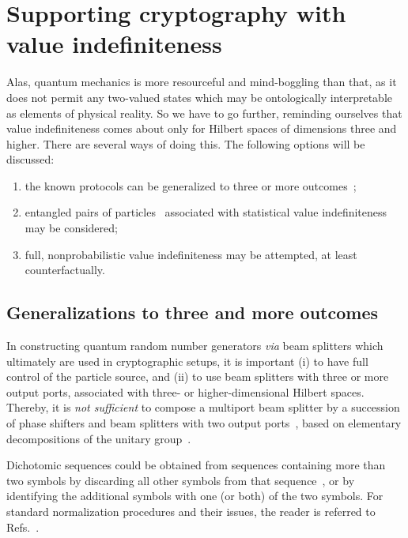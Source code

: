 \documentclass[12pt]{elsarticle}%
\begin{document}
\section{Supporting cryptography with value indefiniteness}

Alas, quantum mechanics is more resourceful and mind-boggling than that,
as it does not permit any two-valued states which may be ontologically  interpretable
as elements of physical reality.
So we have to go further, reminding ourselves that value indefiniteness
comes about only for Hilbert spaces of dimensions three and higher.
There are several ways of doing this.
The following options will be discussed:
\begin{enumerate}
\item
the known protocols can be generalized to three or more outcomes~\cite{PhysRevLett.85.3313};
\item
entangled pairs of particles~\cite{ekert91} associated with statistical value indefiniteness may be considered;
\item
full, nonprobabilistic value indefiniteness may be attempted, at least counterfactually.
\end{enumerate}


\subsection{Generalizations to three and more outcomes}

In constructing quantum random number generators {\em via} beam splitters
which ultimately are used in cryptographic setups, it is important
(i)  to have full control of the particle source, and
(ii) to use beam splitters with three or more output ports,
associated with three- or higher-dimensional Hilbert spaces.
Thereby, it is {\em not sufficient} to compose a multiport beam splitter
by a succession of phase shifters and beam splitters
with two output ports~\cite{rzbb,svozil-2004-analog},
based on elementary decompositions of the unitary group~\cite{murnaghan}.

Dichotomic sequences could be obtained from sequences containing more than two symbols
by discarding all other symbols from that sequence~\cite{MR997340},
or by identifying the additional symbols with one (or both) of the two symbols.
For standard normalization procedures and their issues,
the reader is referred to Refs.~\cite{von-neumann1,Samuelson-1968,elias-72,PeresY-1992,dichtl-2007,Lacharme-2008}.
\end{document}
